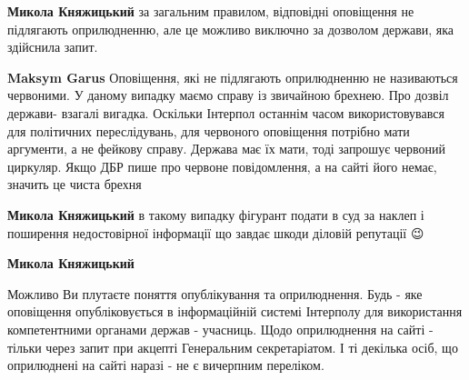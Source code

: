 \begin{itemize}
\begin{itemize}
\textbf{Микола Княжицький} за загальним правилом, відповідні оповіщення не підлягають оприлюдненню, але це можливо виключно за дозволом держави, яка здійснила запит.


 
\textbf{Maksym Garus} Оповіщення, які не підлягають оприлюдненню не називаються червоними. У даному випадку маємо справу із звичайною брехнею. Про дозвіл держави- взагалі вигадка. Оскільки Інтерпол останнім часом використовувався для політичних переслідувань, для червоного оповіщення потрібно мати аргументи, а не фейкову справу. Держава має їх мати, тоді запрошує червоний циркуляр. Якщо ДБР пише про червоне повідомлення, а на сайті його немає, значить це чиста брехня

 
\textbf{Микола Княжицький} в такому випадку фігурант подати в суд за наклеп і поширення недостовірної інформації що завдає шкоди діловій репутації 😉

 
\textbf{Микола Княжицький} 

Можливо Ви плутаєте поняття опублікування та оприлюднення. Будь - яке
оповіщення опубліковується в інформаційній системі Інтерполу для використання
компетентними органами держав - учасниць. Щодо оприлюднення на сайті - тільки
через запит при акцепті Генеральним секретаріатом. І ті декілька осіб, що
оприлюднені на сайті наразі - не є вичерпним переліком.



 

\end{itemize}
\end{itemize}
